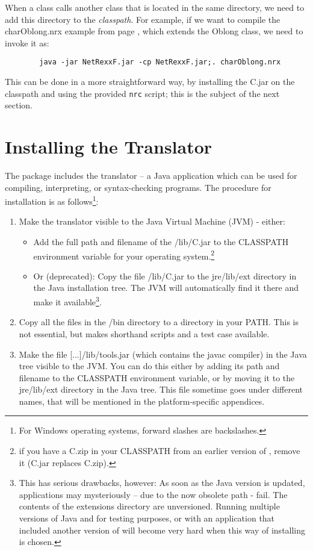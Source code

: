 When a class calls another class that is located in the same
directory, we need to add this directory to the \emph{classpath}. For
example, if we want to compile the charOblong.nrx example from page
\pageref{charoblong}, which extends the Oblong class, we need to
invoke it as:
 \begin{verbatim}
        java -jar NetRexxF.jar -cp NetRexxF.jar;. charOblong.nrx
\end{verbatim}
This can be done in a more straightforward way, by installing the
\nr{}C.jar on the classpath and using the provided \texttt{nrc}
script; this is the subject of the next section.

\section{Installing the \nr{} Translator}
The \nr{} package includes the \nr{} translator – a Java application which can be used for compiling, interpreting, or syntax-checking \nr{} programs. The procedure for installation is as follows\footnote{For Windows operating systems, forward slashes are backslashes.}:
\begin{enumerate}
\item Make the translator visible to the Java Virtual Machine (JVM) - either:
\begin{itemize} 
\item Add the full path and filename of the \nr{}/lib/\nr{}C.jar to the CLASSPATH environment variable for your operating system.\footnote{if you have a \nr{}C.zip in your CLASSPATH from an earlier version of \nr{}, remove it (\nr{}C.jar replaces \nr{}C.zip).}
\item Or (deprecated): Copy the file \nr{}/lib/\nr{}C.jar to the jre/lib/ext directory in the Java installation tree. The JVM will automatically find it there and make it available\footnote{ This has serious drawbacks, however:
As soon as the Java version is updated, \nr{} applications may
mysteriously – due to the now obsolete path - fail. The contents of
the extensions directory are unversioned.
Running multiple versions of Java and \nr{} for testing purposes, or
with an application that included another version of \nr{} will become very hard when this way of installing is chosen.}.
\end{itemize}
\item Copy all the files in the \nr{}/bin directory to a directory in your PATH. This is not essential, but makes shorthand scripts and a test case available. 
\item Make the file [...]/lib/tools.jar (which contains the javac compiler) in the Java tree visible to the JVM. You can do this either by adding its path and filename to the CLASSPATH environment variable, or by moving it to the jre/lib/ext directory in the Java tree. This file sometime goes under different names, that will be mentioned in the platform-specific appendices.
\end{enumerate}
